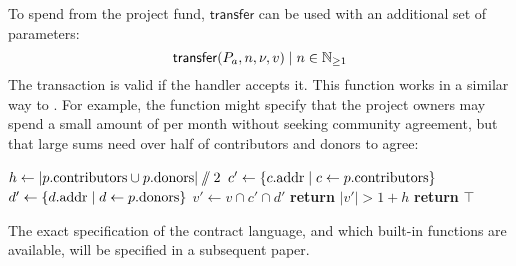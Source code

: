 To spend \oscoin{} from the project fund, $\mathsf{transfer}$ can be used with an
additional set of parameters:
\[
    \mathsf{transfer}\lparen P_a, n, \nu, v\rparen \mid n \in \mathbb{N}_{\geq 1}
\]
The transaction is valid if the handler  accepts
it. This function works in a similar way to . For
example, the function might specify that the project owners may spend a small
amount of \oscoin{} per month without seeking community agreement, but that
large sums need over half of contributors and donors to agree:
\medskip
\begin{algorithmic}[0]
            \State $h \gets |p.{\mathrm{contributors}} \cup p.{\mathrm{donors}}| \sslash 2$
            \State $c' \gets \{ c.{\mathrm{addr}} \mid c \gets p.{\mathrm{contributors}} \}$
            \State $d' \gets \{ d.{\mathrm{addr}} \mid d \gets p.{\mathrm{donors}} \}$
            \State $v' \gets v \cap c' \cap d'$
            \State \textbf{return} $|v'| > 1 + h$
            \Else
            \State \textbf{return} $\top$
        \EndIf
    \EndProcedure
\end{algorithmic}

The exact specification of the contract language, and which built-in functions
are available, will be specified in a subsequent paper.

